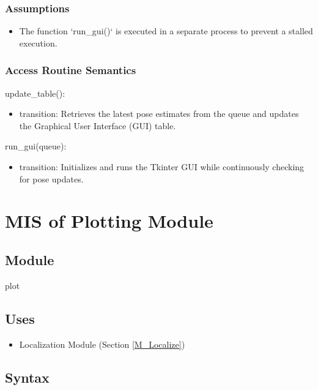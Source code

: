 \documentclass[12pt, titlepage]{article}
\begin{document}
\subsubsection{Assumptions}
\begin{itemize}
  \item The function `run\_gui()` is executed in a separate process to prevent a stalled execution.
\end{itemize}
\subsubsection{Access Routine Semantics}

\noindent update\_table():
\begin{itemize}
    \item transition: Retrieves the latest pose estimates from the queue and updates the Graphical User Interface (GUI) table.
\end{itemize}

\noindent run\_gui(queue):
\begin{itemize}
    \item transition: Initializes and runs the Tkinter GUI while continuously checking for pose updates.
\end{itemize}



\newpage

\section{MIS of Plotting Module} \label{M_Plotting}

\subsection{Module}

plot 

\subsection{Uses}
\begin{itemize}
  \item Localization Module (Section \ref{M_Localize})
\end{itemize}

\subsection{Syntax}
\end{document}
